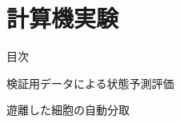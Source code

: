 \section{計算機実験}

\begin{frame}[noframenumbering]{目次}
    \tableofcontents[currentsection]
\end{frame}

\begin{frame}{検証用データによる状態予測評価}
    
\end{frame}

\begin{frame}{遊離した細胞の自動分取}
    
\end{frame}
